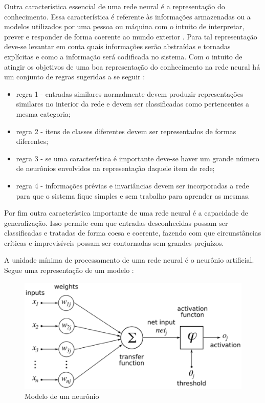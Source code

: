 Outra característica essencial de uma rede neural é a representação do conhecimento. Essa característica é referente às informações armazenadas ou a modelos utilizados por uma pessoa ou máquina com o intuito de interpretar, prever e responder de forma coerente ao mundo exterior \cite{haykin2009neural}. Para tal representação deve-se levantar em conta quais informações serão abstraídas e tornadas explícitas e como a informação será codificada no sistema. Com o intuito de atingir os objetivos de uma boa representação do conhecimento na rede neural há um conjunto de regras sugeridas a se seguir \cite{haykin2009neural}: 
\begin{itemize}
	\item regra 1 - entradas similares normalmente devem produzir representações similares no interior da rede e devem ser classificadas como pertencentes a mesma categoria;
	\item regra 2 - itens de classes diferentes devem ser representados de formas diferentes;
	\item regra 3 - se uma característica é importante deve-se haver um grande número de neurônios envolvidos na representação daquele item de rede;
	\item regra 4 - informações prévias e invariâncias devem ser incorporadas a rede para que o sistema fique simples e sem trabalho para aprender as mesmas.
\end{itemize}

Por fim outra característica importante de uma rede neural é a capacidade de generalização. Isso permite com que entradas desconhecidas possam ser classificadas e tratadas de forma coesa e coerente, fazendo com que circunstâncias críticas e imprevisíveis possam ser contornadas sem grandes prejuízos. 

A unidade mínima de processamento de uma rede neural é o neurônio artificial. Segue uma representação de um modelo \cite{haykin2009neural}: 

\begin{figure}[h]
	\centering
		\includegraphics[scale=0.7]{figuras/neuron.eps}
	\caption{Modelo de um neurônio}
\end{figure}

